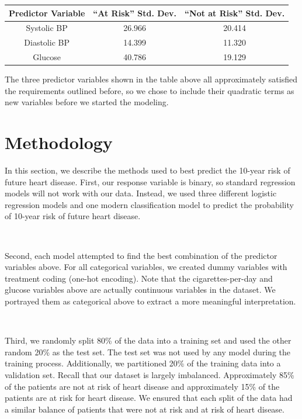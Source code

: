 \documentclass[10pt]{article}
\begin{document}
\begin{table}[h!]
\centering
\begin{tabular}{| c | c | c | } 
\hline
Predictor Variable & ``At Risk'' Std. Dev. & ``Not at Risk'' Std. Dev.\\ 
\hline
\hline
Systolic BP & 26.966 & 20.414 \\
\hline
Diastolic BP & 14.399 & 11.320 \\
\hline
Glucose & 40.786 & 19.129 \\
\hline  
\end{tabular}
\end{table}

The three predictor variables shown in the table above all approximately satisfied the requirements outlined before, so we chose to include their quadratic terms as new variables before we started the modeling. 


\section*{Methodology}

In this section, we describe the methods used to best predict the 10-year risk of future heart disease. First, our response variable is binary, so standard regression models will not work with our data. Instead, we used three different logistic regression models and one modern classification model to predict the probability of 10-year risk of future heart disease. 

\

Second, each model attempted to find the best combination of the predictor variables above. For all categorical variables, we created dummy variables with treatment coding (one-hot encoding). Note that the cigarettes-per-day and glucose variables above are actually continuous variables in the dataset. We portrayed them as categorical above to extract a more meaningful interpretation.

\

Third, we randomly split 80\% of the data into a training set and used the other random 20\% as the test set. The test set was not used by any model during the training process. Additionally, we partitioned 20\% of the training data into a validation set. Recall that our dataset is largely imbalanced. Approximately 85\% of the patients are not at risk of heart disease and approximately 15\% of the patients are at risk for heart disease. We ensured that each split of the data had a similar balance of patients that were not at risk and at risk of heart disease.
\end{document}
